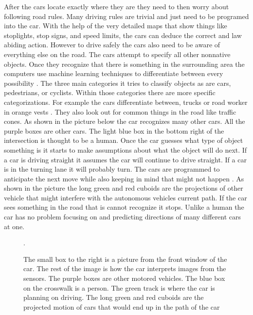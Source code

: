 \documentclass[11pt]{article}
\begin{document}
After the cars locate exactly where they are they need to then worry about following road rules. Many driving rules are trivial and just need to be programed
into the car. With the help of the very detailed maps that show things like stoplights, stop signs, and speed limits, the cars can deduce the correct and
law abiding action. However to drive safely the cars also need to be aware of everything else on the road. The cars attempt to specify all other nonnative
objects. Once they recognize that there is something in the surrounding area the computers use machine learning techniques to
differentiate between every possibility \cite{zhu2012object}. The three main categories it tries to classify objects as are cars, pedestrians, or cyclists.
Within those categories there are more specific categorizations. For example the cars differentiate between, trucks or
road worker in orange vests \cite{zhu2012object}. They also look out for common things in the road like traffic cones. As shown in the picture below the car recognizes many other cars. All the purple boxes are other cars. The light
blue box in the bottom right of the intersection is thought to be a human. Once the car guesses what type of object something is it starts to make assumptions
about what the object will do next. If a car is driving straight it assumes the car will continue to drive straight. If
a car is in the turning lane it will probably turn. The cars are programmed to anticipate the next move while also
keeping in mind that might not happen \cite{chrisurmson2016}. As shown in the picture the long green and red cuboids are the projections of other vehicle that might interfere with
the autonomous vehicles current path. If the car sees something in the road that is cannot recognize it stops. Unlike a human the car has no problem focusing on and predicting directions of many different cars at one.  
\begin{figure}[!ht]
  \centering
                  \caption{The small box to the right is a picture from the front window of the car. The rest of the
                      image is how the car interprets images from the sensors. The purple boxes are other motored
                          vehicles. The blue box on the crosswalk is a person. The green track is where the car is planning on driving.
                           The long green and red cuboids are the projected motion of cars that would end up in the
                  path of the car \cite{chrisurmson2016}}.
\end{figure}
\end{document}

